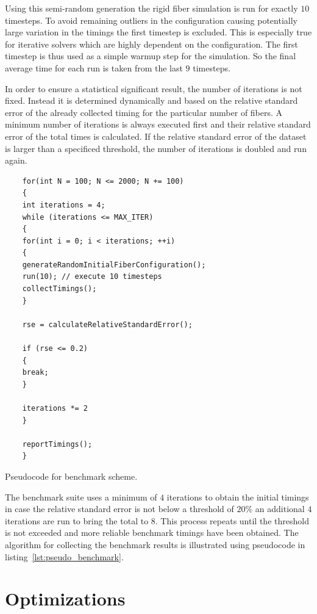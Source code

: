 \documentclass[a4paper,11pt]{kth-mag}
\begin{document}
Using this semi-random generation the rigid fiber simulation is run for exactly $10$ timesteps. To avoid remaining outliers in the configuration causing potentially large variation in the timings the first timestep is excluded. This is especially true for iterative solvers which are highly dependent on the configuration. The first timestep is thus used as a simple warmup step for the simulation. So the final average time for each run is taken from the last $9$ timesteps.

In order to ensure a statistical significant result, the number of iterations is not fixed. Instead it is determined dynamically and based on the relative standard error of the already collected timing for the particular number of fibers. A minimum number of iterations is always executed first and their relative standard error of the total times is calculated. If the relative standard error of the dataset is larger than a specificed threshold, the number of iterations is doubled and run again.

\begin{listing}
  \centering
  \begin{verbatim}
    for(int N = 100; N <= 2000; N += 100)
    {
    int iterations = 4;
    while (iterations <= MAX_ITER)
    {
    for(int i = 0; i < iterations; ++i)
    {
    generateRandomInitialFiberConfiguration();
    run(10); // execute 10 timesteps
    collectTimings();
    }

    rse = calculateRelativeStandardError();

    if (rse <= 0.2)
    {
    break;
    }

    iterations *= 2
    }

    reportTimings();
    }
  \end{verbatim}
  \caption{Pseudocode for benchmark scheme.}
  \label{lst:pseudo_benchmark}
\end{listing}

The benchmark suite uses a minimum of $4$ iterations to obtain the initial timings in case the relative standard error is not below a threshold of $20\%$ an additional $4$ iterations are run to bring the total to $8$. This process repeats until the threshold is not exceeded and more reliable benchmark timings have been obtained. The algorithm for collecting the benchmark results is illustrated using pseudocode in listing~\ref{lst:pseudo_benchmark}.

\section{Optimizations}
\end{document}
